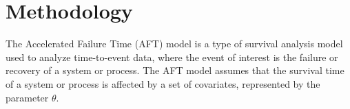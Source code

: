 \documentclass[twoside,a4paper,12pt]{article}
\begin{document}
\begin{comment}
\section*{Literature Review}
In this literature review, we will discuss the impact of the COVID-19 pandemic on stock exchanges worldwide, the evaluation of changes in stock exchanges during the pandemic, and the use of accelerated failure time models (AFTMs) as an alternative to the Cox's regression model for time-to-event data.

\noindent The COVID-19 pandemic has had a significant impact on stock exchanges worldwide. Bieszk-Stolorz and Dmytrow (2021) evaluated the changes on world stock exchanges in connection with the SARS-CoV-2 pandemic. They found that the pandemic led to significant changes in stock exchanges, including increased volatility, reduced liquidity, and a shift towards risk-averse investment strategies.
\noindent The evaluation of changes in stock exchanges during the pandemic has been a focus of research. Ahmed Yahaya and Stephen Alaba John (2023) conducted a study on stock market liquidity and volatility on the Nigerian Exchange Limited. They found that the pandemic led to increased volatility and reduced liquidity in the Nigerian stock market.

\noindent Alternative models for analyzing time-to-event data have been proposed in recent years. C Silambarasan and Elangovan Elangovan (2023) suggested using the accelerated failure time model (AFTM) as an alternative to the Cox's regression model for analyzing time-to-event data. They argued that the AFTM provides a more flexible and interpretable framework for analyzing time-to-event data.

\noindent Tasneem Fatima Alam, M. Shafiqur Rahman, and Wasimul Bari (2022) conducted a study on the estimation for accelerated failure time models with small or rare event survival data. They found that the estimation of AFTMs with small or rare event survival data can be challenging due to the lack of sufficient data for estimating the model parameters. They proposed a new estimation method that addresses this issue.

\end{comment}
\section*{Methodology} 
\noindent The Accelerated Failure Time (AFT) model is a type of survival analysis model used to analyze time-to-event data, where the event of interest is the failure or recovery of a system or process. The AFT model assumes that the survival time of a system or process is affected by a set of covariates, represented by the parameter $\theta$.  
\end{document}
